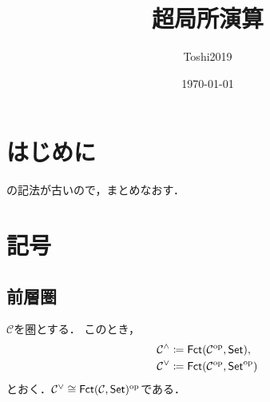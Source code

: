 \documentclass[leqno, 10pt, a4paper, dvipdfmx]{jsarticle}
\title{超局所演算}
\author{Toshi2019}
\date{\today}
\theoremstyle{definition}
\newcommand{\Set}{\mathsf{Set}}
\newcommand{\op}{{\rm op}} %
\numberwithin{equation}{section}
\newcommand{\cat}{\mathcal{C}}
\newcommand{\Fct}{\mathop{\mathsf{Fct}}\nolimits}
\newcommand{\precat}[1][]{{#1}^{\wedge}}
\newcommand{\coprecat}[1][]{{#1}^{\vee}}
\theoremstyle{mystyle}
\begin{document}
\maketitle

\section{はじめに}

\cite[sec.6.1]{KS90}の記法が古いので，まとめなおす．

\section{記号}
\subsection{前層圏}
\(\cat\)を圏とする．
このとき，
\begin{align*}
    \precat[\cat]
    &\coloneqq
    \Fct(\cat^{\op},\Set),\\ 
    \coprecat[\cat]
    &\coloneqq    
    \Fct(\cat^{\op},\Set^{\op})
\end{align*}
とおく．\(\coprecat[\cat]\cong\Fct(\cat,\Set)^{\op}\)である．
\end{document}
